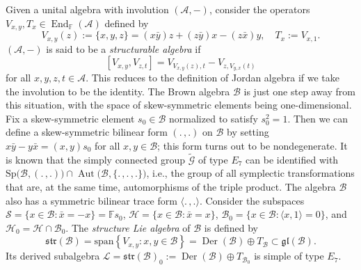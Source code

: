 \documentclass[a4paper,reqno]{amsart}
\theoremstyle{definition}
\numberwithin{theorem}{section}
\numberwithin{equation}{section}
\begin{document}
Given a unital algebra with involution $({\mathcal{A}},-)$, consider the operators $V_{x,y},T_x\in\operatorname{\mathrm{End}}_{\mathbb{F}}({\mathcal{A}})$ defined by
\[
V_{x,y}(z){:=}\{ x,y,z\}=(x\bar y)z+(z\bar y)x-(z\bar x)y,\quad T_x{:=} V_{x,1}.
\]
$({\mathcal{A}},-)$ is said to be a \emph{structurable algebra} if 
\[
[V_{x,y},V_{z,t}]=V_{V_{x,y}(z),t}-V_{z,V_{y,x}(t)}
\]
for all $x,y,z,t\in{\mathcal{A}}$. This reduces to the definition of Jordan algebra if we take the involution to be the identity. The Brown algebra ${\mathcal{B}}$ is just one step away from this situation, with the space of skew-symmetric elements being one-dimensional. Fix a skew-symmetric element $s_0\in{\mathcal{B}}$ normalized to satisfy $s_0^2=1$. Then we can define a skew-symmetric bilinear form $(.\,,.)$ on ${\mathcal{B}}$ by setting $x\bar y-y\bar x = (x,y) s_0$ for all $x,y\in{\mathcal{B}}$; this form turns out to be nondegenerate. It is known that the simply connected group $\tilde{\mathcal{G}}$ of type $E_7$ can be identified with ${\mathrm{Sp}}\bigl({\mathcal{B}},(.\,,.)\bigr)\cap\operatorname{\mathrm{Aut}}\bigl({\mathcal{B}},\{.\,,.\,,.\}\bigr)$, i.e., the group of all symplectic transformations that are, at the same time, automorphisms of the triple product. The algebra ${\mathcal{B}}$ also has a symmetric bilinear trace form $\langle.\,,.\rangle$. Consider the subspaces ${\mathcal{S}}=\{x\in{\mathcal{B}}: \bar x=-x\}={\mathbb{F}} s_0$, ${\mathcal{H}}=\{x\in{\mathcal{B}}: \bar x=x\}$, ${\mathcal{B}}_0=\{x\in{\mathcal{B}}: \langle x,1\rangle=0\}$, and ${\mathcal{H}}_0={\mathcal{H}}\cap{\mathcal{B}}_0$. The \emph{structure Lie algebra} of ${\mathcal{B}}$ is defined by 
\[
{\mathfrak{str}}({\mathcal{B}})={\mathrm{span}\left\{{V_{x,y}: x,y\in{\mathcal{B}}}\right\}}=\operatorname{\mathrm{Der}}({\mathcal{B}})\oplus T_{\mathcal{B}}\subset {{\mathfrak{gl}}}({\mathcal{B}}).
\]
Its derived subalgebra ${\mathcal{L}}={\mathfrak{str}}({\mathcal{B}})_0{:=} \operatorname{\mathrm{Der}}({\mathcal{B}})\oplus T_{{\mathcal{B}}_0}$ is simple of type $E_7$.
\end{document}
